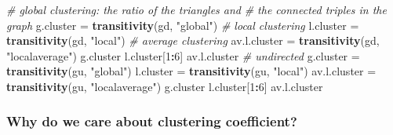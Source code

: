 \documentclass[
]{article}
\newenvironment{Shaded}{\begin{snugshade}}{\end{snugshade}}
\newcommand{\CommentTok}[1]{\textcolor[rgb]{0.56,0.35,0.01}{\textit{#1}}}
\newcommand{\DecValTok}[1]{\textcolor[rgb]{0.00,0.00,0.81}{#1}}
\newcommand{\FunctionTok}[1]{\textcolor[rgb]{0.13,0.29,0.53}{\textbf{#1}}}
\newcommand{\NormalTok}[1]{#1}
\newcommand{\OtherTok}[1]{\textcolor[rgb]{0.56,0.35,0.01}{#1}}
\newcommand{\SpecialCharTok}[1]{\textcolor[rgb]{0.81,0.36,0.00}{\textbf{#1}}}
\newcommand{\StringTok}[1]{\textcolor[rgb]{0.31,0.60,0.02}{#1}}
\begin{document}
\footnotesize

\begin{Shaded}
\begin{Highlighting}[]
\CommentTok{\# global clustering: the ratio of the triangles and }
\CommentTok{\# the connected triples in the graph}
\NormalTok{g.cluster }\OtherTok{=} \FunctionTok{transitivity}\NormalTok{(gd, }\StringTok{"global"}\NormalTok{)}
\CommentTok{\# local clustering}
\NormalTok{l.cluster }\OtherTok{=} \FunctionTok{transitivity}\NormalTok{(gd, }\StringTok{"local"}\NormalTok{) }
\CommentTok{\# average clustering}
\NormalTok{av.l.cluster }\OtherTok{=} \FunctionTok{transitivity}\NormalTok{(gd, }\StringTok{"localaverage"}\NormalTok{) }
\NormalTok{g.cluster}
\NormalTok{l.cluster[}\DecValTok{1}\SpecialCharTok{:}\DecValTok{6}\NormalTok{]}
\NormalTok{av.l.cluster}
\CommentTok{\# undirected}
\NormalTok{g.cluster }\OtherTok{=} \FunctionTok{transitivity}\NormalTok{(gu, }\StringTok{"global"}\NormalTok{)}
\NormalTok{l.cluster }\OtherTok{=} \FunctionTok{transitivity}\NormalTok{(gu, }\StringTok{"local"}\NormalTok{)}
\NormalTok{av.l.cluster }\OtherTok{=} \FunctionTok{transitivity}\NormalTok{(gu, }\StringTok{"localaverage"}\NormalTok{)}
\NormalTok{g.cluster}
\NormalTok{l.cluster[}\DecValTok{1}\SpecialCharTok{:}\DecValTok{6}\NormalTok{]}
\NormalTok{av.l.cluster}
\end{Highlighting}
\end{Shaded}

\normalsize

\hypertarget{why-do-we-care-about-clustering-coefficient}{%
\subsubsection{Why do we care about clustering coefficient?}\label{why-do-we-care-about-clustering-coefficient}}
\end{document}

